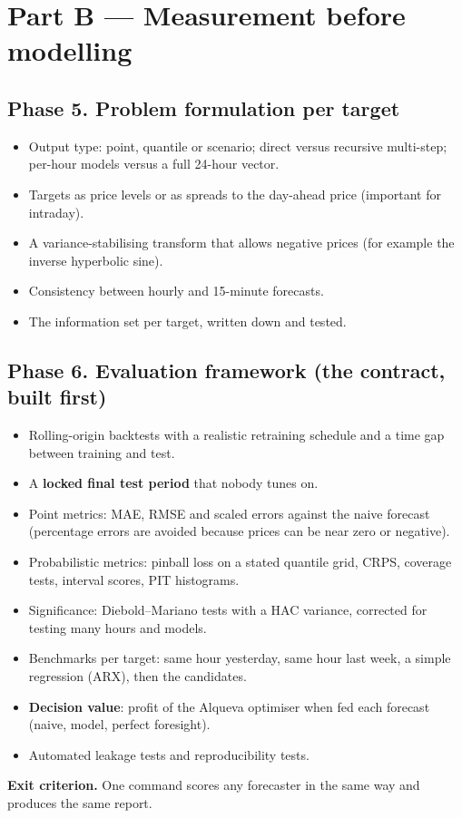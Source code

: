 \documentclass[11pt,a4paper]{article}
\newcommand{\exitcrit}[1]{\par\smallskip\noindent\colorbox{soft}{\parbox{\dimexpr\linewidth-2\fboxsep}{\textbf{Exit criterion.} #1}}\par}
\begin{document}
\section{Part B --- Measurement before modelling}

\subsection{Phase 5. Problem formulation per target}
\begin{itemize}
\item Output type: point, quantile or scenario; direct versus recursive multi-step; per-hour models versus a
  full 24-hour vector.
\item Targets as price levels or as spreads to the day-ahead price (important for intraday).
\item A variance-stabilising transform that allows negative prices (for example the inverse hyperbolic sine).
\item Consistency between hourly and 15-minute forecasts.
\item The information set per target, written down and tested.
\end{itemize}

\subsection{Phase 6. Evaluation framework (the contract, built first)}
\begin{itemize}
\item Rolling-origin backtests with a realistic retraining schedule and a time gap between training and test.
\item A \textbf{locked final test period} that nobody tunes on.
\item Point metrics: MAE, RMSE and scaled errors against the naive forecast (percentage errors are avoided because
  prices can be near zero or negative).
\item Probabilistic metrics: pinball loss on a stated quantile grid, CRPS, coverage tests, interval scores,
  PIT histograms.
\item Significance: Diebold--Mariano tests with a HAC variance, corrected for testing many hours and models.
\item Benchmarks per target: same hour yesterday, same hour last week, a simple regression (ARX), then the candidates.
\item \textbf{Decision value}: profit of the Alqueva optimiser when fed each forecast (naive, model, perfect foresight).
\item Automated leakage tests and reproducibility tests.
\end{itemize}
\exitcrit{One command scores any forecaster in the same way and produces the same report.}
\end{document}

